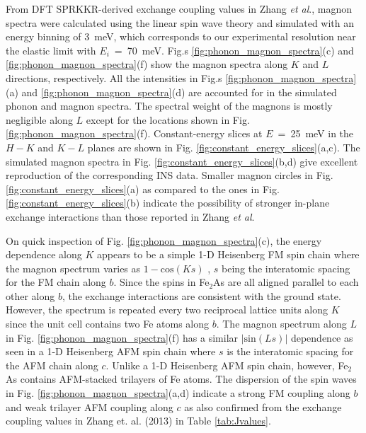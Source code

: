 \documentclass[10pt,doublespacing,edeposit]{uiucthesis2020}
\begin{document}
\begin{mainmatter}
From DFT SPRKKR-derived exchange coupling values in Zhang \emph{et al}.,\cite{Zhang2013} magnon spectra were calculated using the linear spin wave theory and simulated with an energy binning of 3~meV, which corresponds to our experimental resolution near the elastic limit with $E_i$~=~70~meV. Fig.s \ref{fig:phonon_magnon_spectra}(c) and \ref{fig:phonon_magnon_spectra}(f) show the magnon spectra along $K$ and $L$ directions, respectively. All the intensities in Fig.s \ref{fig:phonon_magnon_spectra}(a) and \ref{fig:phonon_magnon_spectra}(d) are accounted for in the simulated phonon and magnon spectra. The spectral weight of the magnons is mostly negligible along $L$ except for the locations shown in Fig. \ref{fig:phonon_magnon_spectra}(f). Constant-energy slices at $E$~=~25~meV in the $H-K$ and $K-L$ planes are shown in Fig. \ref{fig:constant_energy_slices}(a,c). The simulated magnon spectra in Fig. \ref{fig:constant_energy_slices}(b,d) give excellent reproduction of the corresponding INS data. Smaller magnon circles in Fig. \ref{fig:constant_energy_slices}(a) as compared to the ones in Fig. \ref{fig:constant_energy_slices}(b) indicate the possibility of stronger in-plane exchange interactions than those reported in Zhang \emph{et al}.\cite{Zhang2013}


On quick inspection of Fig. \ref{fig:phonon_magnon_spectra}(c), the energy dependence along $K$ appears to be a simple 1-D Heisenberg FM spin chain where the magnon spectrum varies as $1 - \textrm{cos} (Ks)$ \cite{Stancil}, $s$ being the interatomic spacing for the FM chain along $b$. Since the spins in Fe$_2$As are all aligned parallel to each other along $b$, the exchange interactions are consistent with the ground state. However, the spectrum is repeated every two reciprocal lattice units along $K$ since the unit cell contains two Fe atoms along $b$. The magnon spectrum along $L$ in Fig. \ref{fig:phonon_magnon_spectra}(f) has a similar $|\textrm{sin}(Ls)|$ dependence as seen in a 1-D Heisenberg AFM spin chain where $s$ is the interatomic spacing for the AFM chain along $c$. Unlike a 1-D Heisenberg AFM spin chain, however, Fe$_2$As contains AFM-stacked trilayers of Fe atoms. 
The dispersion of the spin waves in Fig. \ref{fig:phonon_magnon_spectra}(a,d) indicate a strong FM coupling along $b$ and weak trilayer AFM coupling along $c$ as also confirmed from the exchange coupling values in Zhang et. al. (2013) \cite{Zhang2013} in Table \ref{tab:Jvalues}.



\end{mainmatter}
\end{document}
